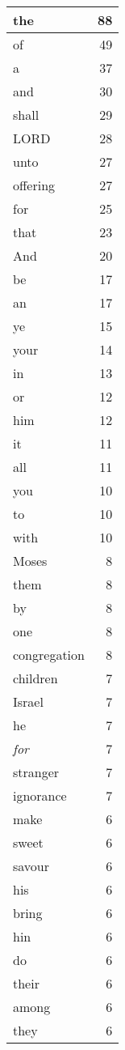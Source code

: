 \begin{center}
\begin{longtable}{l|r}
\hline \hline
\endlastfoot
the & 88 \\ \hline
of & 49 \\ \hline
a & 37 \\ \hline
and & 30 \\ \hline
shall & 29 \\ \hline
LORD & 28 \\ \hline
unto & 27 \\ \hline
offering & 27 \\ \hline
for & 25 \\ \hline
that & 23 \\ \hline
And & 20 \\ \hline
be & 17 \\ \hline
an & 17 \\ \hline
ye & 15 \\ \hline
your & 14 \\ \hline
in & 13 \\ \hline
or & 12 \\ \hline
him & 12 \\ \hline
it & 11 \\ \hline
all & 11 \\ \hline
you & 10 \\ \hline
to & 10 \\ \hline
with & 10 \\ \hline
Moses & 8 \\ \hline
them & 8 \\ \hline
by & 8 \\ \hline
one & 8 \\ \hline
congregation & 8 \\ \hline
children & 7 \\ \hline
Israel & 7 \\ \hline
he & 7 \\ \hline
\emph{for} & 7 \\ \hline
stranger & 7 \\ \hline
ignorance & 7 \\ \hline
make & 6 \\ \hline
sweet & 6 \\ \hline
savour & 6 \\ \hline
his & 6 \\ \hline
bring & 6 \\ \hline
hin & 6 \\ \hline
do & 6 \\ \hline
their & 6 \\ \hline
among & 6 \\ \hline
they & 6 \\ \hline

\end{longtable}
\end{center}
